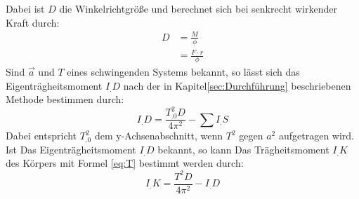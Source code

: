 Dabei ist $D$ die Winkelrichtgröße und berechnet sich bei senkrecht wirkender Kraft durch: 
\begin{align}
D 	&= \frac{M}{\phi}\nonumber\\ 
	&= \frac{F\cdot r}{\phi} \label{eq:D}
\end{align}
Sind $\vec{a}$ und $T$ eines schwingenden Systems bekannt, so lässt sich das Eigenträgheitsmoment $I_.D$ nach der in Kapitel\ref{sec:Durchführung} beschriebenen Methode bestimmen durch:
\begin{equation}
I_.D = \frac{T_.0^2D}{4\pi^2}-\sum I_.S \label{eq:I_D}
\end{equation}
Dabei entspricht $T_.0^2$ dem y-Achsenabschnitt, wenn $T^2$ gegen $a^2$ aufgetragen wird.
Ist Das Eigenträgheitsmoment $I_.D$ bekannt, so kann Das Trägheitsmoment $I_.K$ des Körpers mit Formel \eqref{eq:T} bestimmt werden durch:
\begin{equation}
I_.K = \frac{T^2D}{4\pi^2}-I_.D  \label{eq:I_K}
\end{equation}